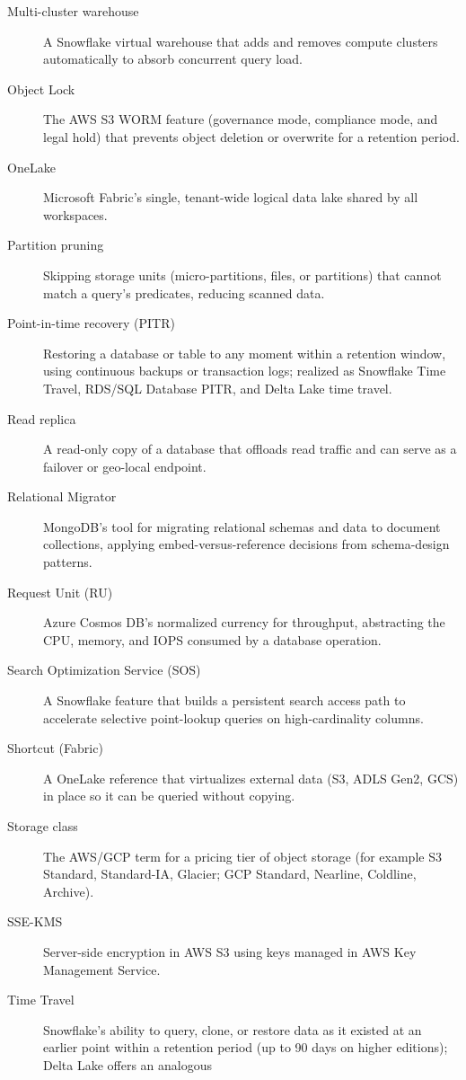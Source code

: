 \begin{description}
  \item[Multi-cluster warehouse] A Snowflake virtual warehouse that adds and removes compute clusters
    automatically to absorb concurrent query load.
  \item[Object Lock] The AWS S3 WORM feature (governance mode, compliance mode, and legal hold) that
    prevents object deletion or overwrite for a retention period.
  \item[OneLake] Microsoft Fabric's single, tenant-wide logical data lake shared by all workspaces.
  \item[Partition pruning] Skipping storage units (micro-partitions, files, or partitions) that cannot
    match a query's predicates, reducing scanned data.
  \item[Point-in-time recovery (PITR)] Restoring a database or table to any moment within a retention
    window, using continuous backups or transaction logs; realized as Snowflake Time Travel, RDS/SQL
    Database PITR, and Delta Lake time travel.
  \item[Read replica] A read-only copy of a database that offloads read traffic and can serve as a
    failover or geo-local endpoint.
  \item[Relational Migrator] MongoDB's tool for migrating relational schemas and data to document
    collections, applying embed-versus-reference decisions from schema-design patterns.
  \item[Request Unit (RU)] Azure Cosmos DB's normalized currency for throughput, abstracting the CPU,
    memory, and IOPS consumed by a database operation.
  \item[Search Optimization Service (SOS)] A Snowflake feature that builds a persistent search access
    path to accelerate selective point-lookup queries on high-cardinality columns.
  \item[Shortcut (Fabric)] A OneLake reference that virtualizes external data (S3, ADLS Gen2, GCS) in
    place so it can be queried without copying.
  \item[Storage class] The AWS/GCP term for a pricing tier of object storage (for example S3 Standard,
    Standard-IA, Glacier; GCP Standard, Nearline, Coldline, Archive).
  \item[SSE-KMS] Server-side encryption in AWS S3 using keys managed in AWS Key Management Service.
  \item[Time Travel] Snowflake's ability to query, clone, or restore data as it existed at an earlier
    point within a retention period (up to 90 days on higher editions); Delta Lake offers an analogous

\end{description}
